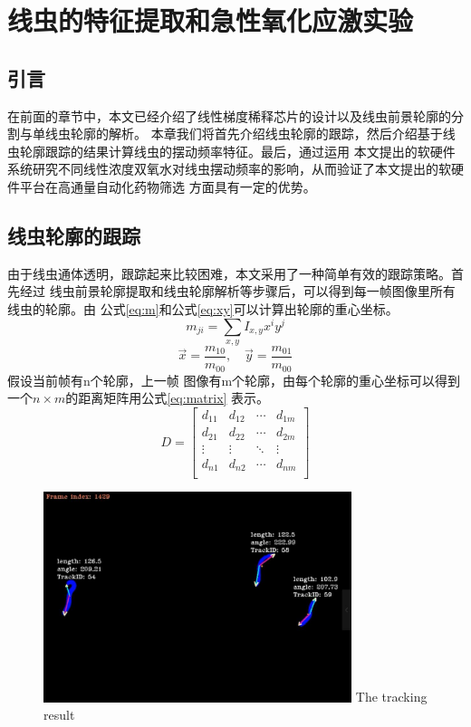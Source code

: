 \chapter{线虫的特征提取和急性氧化应激实验}
\section{引言}
	在前面的章节中，本文已经介绍了线性梯度稀释芯片的设计以及线虫前景轮廓的分割与单线虫轮廓的解析。
	本章我们将首先介绍线虫轮廓的跟踪，然后介绍基于线虫轮廓跟踪的结果计算线虫的摆动频率特征。最后，通过运用
	本文提出的软硬件系统研究不同线性浓度双氧水对线虫摆动频率的影响，从而验证了本文提出的软硬件平台在高通量自动化药物筛选
	方面具有一定的优势。
\section{线虫轮廓的跟踪}
	由于线虫通体透明，跟踪起来比较困难，本文采用了一种简单有效的跟踪策略。首先经过
	线虫前景轮廓提取和线虫轮廓解析等步骤后，可以得到每一帧图像里所有线虫的轮廓。由
	公式\ref{eq:m}和公式\ref{eq:xy}可以计算出轮廓的重心坐标。
	\begin{equation}
		m_{ji}=\sum_{x,y}I_{x,y}x^iy^j \label{eq:m}
	\end{equation}
	\begin{equation}
		\vec{x}=\frac{m_{10}}{m_{00}},\quad \vec{y}=\frac{m_{01}}{m_{00}}\label{eq:xy}
	\end{equation}
	假设当前帧有n个轮廓，上一帧
	图像有m个轮廓，由每个轮廓的重心坐标可以得到一个$n\times m$的距离矩阵用公式\ref{eq:matrix}
	表示。
		\begin{equation}
                        D=\left[
                \begin{matrix}
                 d_{11}      & d_{12}      & \cdots & d_{1m}      \\
                 d_{21}      & d_{22}      & \cdots & d_{2m}      \\
                 \vdots & \vdots & \ddots & \vdots \\
                 d_{n1}      & d_{n2}      & \cdots & d_{nm}      \\
                \end{matrix}
                \right]\label{eq:matrix}
    \end{equation}
	\begin{figure}[t]
	  \centering
	  \includegraphics[width=9cm]{figure/chap5/tracking.jpg}
		{The tracking result}
	  \label{fig:track}
	\end{figure}

